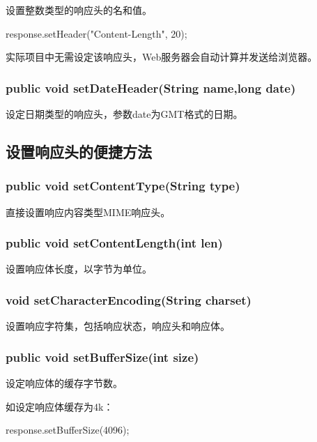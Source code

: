 设置整数类型的响应头的名和值。

\begin{javaCode}
  response.setHeader("Content-Length", 20);  
\end{javaCode}

 实际项目中无需设定该响应头，Web服务器会自动计算并发送给浏览器。

\subsubsection{public void setDateHeader(String name,long date)}

设定日期类型的响应头，参数date为GMT格式的日期。

\subsection{设置响应头的便捷方法} 

\subsubsection{public void setContentType(String type)}

直接设置响应内容类型MIME响应头。

\subsubsection{public void setContentLength(int len)}

设置响应体长度，以字节为单位。

\subsubsection{void setCharacterEncoding(String charset)}

设置响应字符集，包括响应状态，响应头和响应体。

\subsubsection{public void setBufferSize(int size)}

设定响应体的缓存字节数。

如设定响应体缓存为4k：

\begin{javaCode}
  response.setBufferSize(4096);  
\end{javaCode}


